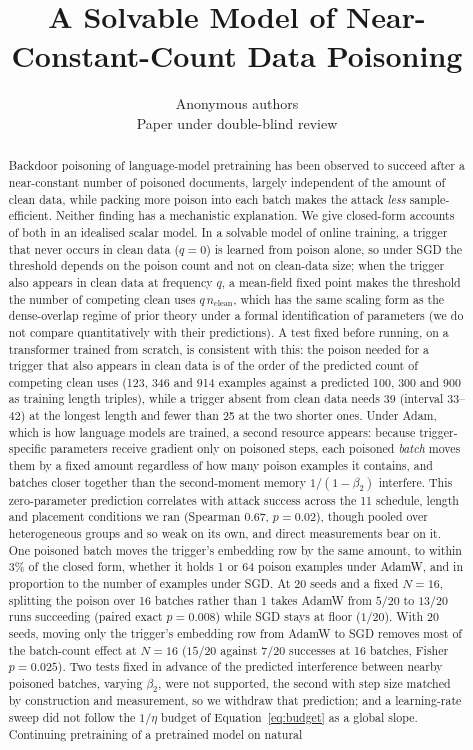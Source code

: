\documentclass{article} %
\title{A Solvable Model of Near-Constant-Count Data Poisoning}
\author{Anonymous authors \\ Paper under double-blind review}
\begin{document}
\maketitle

\begin{abstract}
Backdoor poisoning of language-model pretraining has been observed to succeed after a
near-constant number of poisoned documents, largely independent of the amount of clean
data, while packing more poison into each batch makes the attack \emph{less}
sample-efficient. Neither finding has a mechanistic explanation. We give closed-form accounts of both in an idealised scalar model. In a solvable model of online training, a trigger that never occurs in clean data ($q=0$) is learned from poison alone, so under SGD the threshold depends
on the poison count and not on clean-data size; when the trigger also appears in clean data at frequency $q$, a mean-field fixed point makes the threshold the number of competing clean uses $q\,n_{\text{clean}}$, which has the same scaling form as the dense-overlap regime of prior theory under a formal identification of parameters (we do not compare quantitatively with their predictions). A test fixed before running, on a transformer trained
from scratch, is consistent with this: the poison needed for a trigger that
also appears in clean data is of the order of the predicted count of competing clean uses (123, 346 and 914 examples against a predicted 100, 300 and 900 as training length triples), while a trigger absent from clean data needs 39 (interval 33--42) at the longest length and fewer than 25 at the two shorter ones. Under
Adam, which is how language models are trained, a second resource appears: because
trigger-specific parameters receive gradient only on poisoned steps, each poisoned
\emph{batch} moves them by a fixed amount regardless of how many poison examples it
contains, and batches closer together than the second-moment memory $1/(1-\beta_2)$
interfere. This zero-parameter prediction correlates with attack success
across the 11 schedule, length and placement conditions we ran (Spearman $0.67$,
$p=0.02$), though pooled over heterogeneous groups and so weak on its own, and direct measurements bear on it. One poisoned batch moves the trigger's embedding row by the same amount, to within 3\% of the closed form, whether it holds 1 or 64 poison examples under AdamW, and in proportion to the number of examples under SGD. At 20 seeds and a fixed $N=16$, splitting the poison over 16 batches rather than 1 takes AdamW from $5/20$ to $13/20$ runs succeeding (paired exact $p=0.008$) while SGD stays at floor ($1/20$). With 20 seeds, moving only the trigger's embedding row from AdamW to SGD removes most of the batch-count effect at $N=16$ ($15/20$ against $7/20$ successes at 16 batches, Fisher $p=0.025$). Two tests fixed in advance of the predicted interference between nearby poisoned batches, varying $\beta_2$, were not supported, the second with step size matched by construction and measurement, so we withdraw that prediction; and a learning-rate sweep did not follow the $1/\eta$ budget of Equation~\ref{eq:budget} as a global slope. Continuing pretraining of a pretrained model on natural

\end{abstract}
\end{document}
